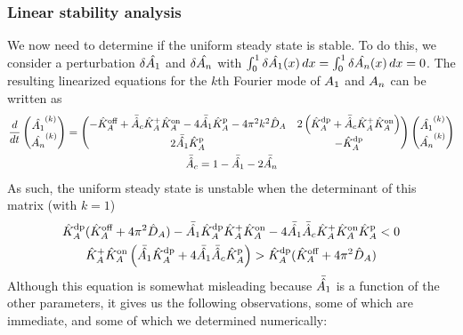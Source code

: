 \documentclass[11pt]{article}
\newcommand{\6}[1]{#1_{\text{6}}}
\newcommand{\3}[1]{#1_{\text{3}}}
\begin{document}
\subsubsection{Linear stability analysis}
We now need to determine if the uniform steady state is stable. To do this, we consider a perturbation $\delta \hat{A_1}$ and $\delta \hat{A_n}$ with $\int_0^1 \delta \hat{A_1}(x) \, dx =\int_0^1 \delta \hat{A_n}(x) \, dx=0$. The resulting linearized equations for the $k$th Fourier mode of $A_1$ and $A_n$ can be written as 
\begin{gather*}
\frac{d}{d t}\begin{pmatrix} \hat{A_1}^{(k)} \\ \hat{A_n}^{(k)} \end{pmatrix} =
 \begin{pmatrix} 
-\hat{K}^\text{off}_A + \bar{\hat{A}}_c \hat{K}^\text{+}_A \hat{K}^\text{on}_A - 4\bar{\hat{A_1}}\hat{K}^\text{p}_A - 4\pi^2 k^2 \hat{D}_A
& 2\left(\hat{K}^\text{dp}_A + \bar{\hat{A}}_c \hat{K}^\text{+}_A \hat{K}^\text{on}_A\right) \\
 2  \bar{\hat{A_1}}\hat{K}^\text{p}_A & -\hat{K}^\text{dp}_A 
\end{pmatrix}
 \begin{pmatrix} 
\hat{A_1}^{(k)} \\ \hat{A_n}^{(k)} 
\end{pmatrix} \\ 
\bar{\hat{A}}_c  = 1-\bar{\hat{A_1}}-2\bar{\hat{A_n}}
\end{gather*}
 As such, the uniform steady state is unstable when the determinant of this matrix (with $k=1$)
\begin{gather}
\nonumber
\hat{K}^\text{dp}_A (\hat{K}^\text{off}_A+4 \pi^2 \hat{D}_A) - \bar{\hat{A_1}} \hat{K}^\text{dp}_A \hat{K}^\text{+}_A  \hat{K}^\text{on}_A - 4 \bar{\hat{A_1}}\bar{\hat{A}}_c \hat{K}^\text{+}_A \hat{K}^\text{on}_A \hat{K}^\text{p}_A < 0 \\  \label{eq:StabCond}
\hat{K}^\text{+}_A \hat{K}^\text{on}_A\left( \bar{\hat{A_1}} \hat{K}^\text{dp}_A  + 4 \bar{\hat{A_1}}\bar{\hat{A}}_c  \hat{K}^\text{p}_A \right) > \hat{K}^\text{dp}_A (\hat{K}^\text{off}_A+4 \pi^2 \hat{D}_A) 
\end{gather}
Although this equation is somewhat misleading because $ \bar{\hat{A_1}}$ is a function of the other parameters, it gives us the following observations, some of which are immediate, and some of which we determined numerically:
\end{document}
